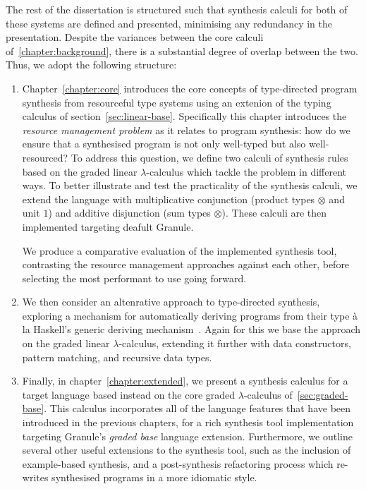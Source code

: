 The rest of the dissertation is structured such that synthesis calculi for both
of these systems are defined and presented, minimising any redundancy in the
presentation. Despite the variances between the core calculi
of~\ref{chapter:background}, there is a substantial degree of overlap between
the two. Thus, we adopt the following structure: 
\begin{enumerate}
        \item Chapter~\ref{chapter:core} introduces the core concepts of
        type-directed program synthesis from resourceful type systems using an
        extenion of the typing calculus of section~\ref{sec:linear-base}.
        Specifically this chapter introduces the \textit{resource management
        problem} as it relates to program synthesis: how do we ensure that a
        synthesised program is not only well-typed but also
        well-resourced? To address this question, we define two calculi
        of synthesis rules based on the graded linear $\lambda$-calculus which
        tackle the problem in different ways. To better illustrate and test the
        practicality of the synthesis calculi, we extend the language with
        multiplicative conjunction (product types $\otimes$ and unit $1$) and
        additive disjunction (sum types $\otimes$). These calculi are then
        implemented targeting deafult Granule.

        We produce a comparative evaluation of the implemented synthesis tool, 
        contrasting the resource management approaches against each other, before 
        selecting the most performant to use going forward.  

        \item We then consider an altenrative approach to type-directed synthesis,
        exploring a mechanism for automatically deriving programs from their
        type à la Haskell's generic deriving mechanism~\cite{generic-deriving}.
        Again for this we base the approach on the graded linear
        $\lambda$-calculus, extending it further with data constructors, pattern
        matching, and recursive data types.
        \item Finally, in chapter~\ref{chapter:extended}, we present a synthesis
        calculus for a target language based instead on the core graded
        $\lambda$-calculus of~\ref{sec:graded-base}. This calculus incorporates
        all of the language features that have been introduced in the previous chapters,
        for a rich synthesis tool implementation targeting Granule's
        \emph{graded base} language extension. Furthermore, we outline several other useful 
        extensions to the synthesis tool, such as the inclusion of example-based synthesis,
        and a post-synthesis refactoring process which re-writes synthesised programs in 
        a more idiomatic style.


\end{enumerate}
